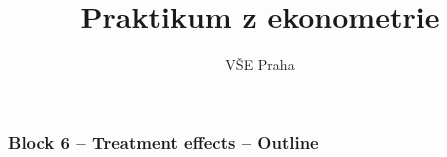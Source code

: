 \documentclass{beamer}
\title[Block 6]{Praktikum z ekonometrie} %
\author{VŠE Praha} %
\institute[4EK417] %
{
\medskip
\textit{Tomáš Formánek} %
}
\date{} %
\begin{document}
\begin{frame}
\titlepage %
\end{frame}
\begin{frame}
\frametitle{Block 6 – Treatment effects – Outline
} %
\tableofcontents %
\end{frame}

\end{document}
